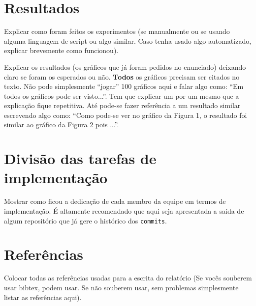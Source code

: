 \documentclass[12pt,a4paper]{article}
\begin{document}
\section{Resultados}

Explicar como foram feitos os experimentos (se manualmente ou se
usando alguma linguagem de script ou algo similar. Caso tenha usado
algo automatizado, explicar brevemente como funcionou).

Explicar os resultados (os gráficos que já foram pedidos no
enunciado) deixando claro se foram os esperados ou não. \textbf{Todos}
os gráficos precisam ser citados no texto. Não pode simplesmente
``jogar'' 100 gráficos aqui e falar algo como: ``Em todos os gráficos
pode ser visto...''. Tem que explicar um por um mesmo que a explicação
fique repetitiva. Até pode-se fazer referência a um resultado similar
escrevendo algo como: ``Como pode-se ver no gráfico da Figura 1, o
resultado foi similar ao gráfico da Figura 2 pois ...''.

\section{Divisão das tarefas de implementação}

Mostrar como ficou a dedicação de cada membro da equipe em termos de
implementação. É altamente recomendado que aqui seja apresentada a
saída de algum repositório que já gere o histórico dos
\texttt{commits}.

\section{Referências}

Colocar todas as referências usadas para a escrita do relatório (Se
vocês souberem usar bibtex, podem usar. Se não souberem usar, sem
problemas simplesmente listar as referências aqui).
\end{document}
